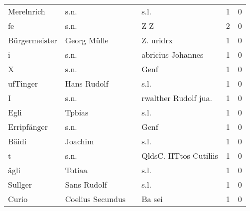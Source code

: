 \begin{center}
\begin{tiny}
\begin{longtabu}{llllrr}
               Merelnrich &                               s.n. &             &                                        s.l. &          1 &         0 \\
                       fe &                               s.n. &             &                                         Z Z &          2 &         0 \\
            Bürgermeister &                        Georg Mülle &             &                                   Z. uridrx &          1 &         0 \\
                        i &                               s.n. &             &                           abricius Johannes &          1 &         0 \\
                        X &                               s.n. &             &                                        Genf &          1 &         0 \\
                 ufTinger &                        Hans Rudolf &             &                                        s.l. &          1 &         0 \\
                        I &                               s.n. &             &                       rwalther Rudolf jua.  &          1 &         0 \\
                     Egli &                             Tpbias &             &                                        s.l. &          1 &         0 \\
              Erripfänger &                               s.n. &             &                                        Genf &          1 &         0 \\
                    Bäidi &                            Joachim &             &                                        s.l. &          1 &         0 \\
                        t &                               s.n. &             &                       QldsC. HTtos Cutiliis &          1 &         0 \\
                     ägli &                             Totiaa &             &                                        s.l. &          1 &         0 \\
                  Sullger &                        Sans Rudolf &             &                                        s.l. &          1 &         0 \\
                    Curio &                   Coelius Secundus &             &                                      Ba sei &          1 &         0 \\

\end{longtabu}
\end{tiny}
\end{center}
